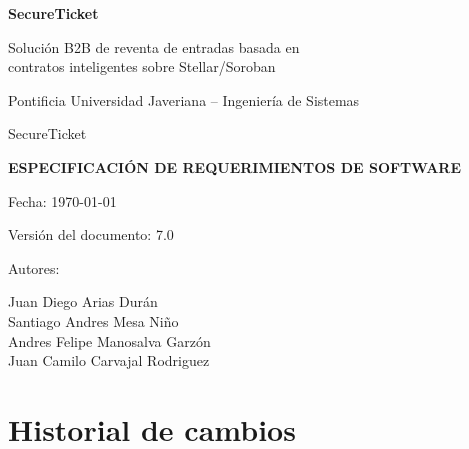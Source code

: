 \documentclass[12pt,letterpaper]{article}
\newcommand{\nombreProyecto}{SecureTicket}
\newcommand{\nombreEmpresa}{SecureTicket}
\newcommand{\universidad}{Pontificia Universidad Javeriana -- Ingeniería de Sistemas}
\newcommand{\versionDoc}{7.0}
\begin{document}
\begin{titlepage}
    \centering
    \vspace*{1cm}
    
    {\Huge \textbf{\nombreProyecto}\par}
    \vspace{0.3cm}
    {\Large Solución B2B de reventa de entradas basada en\\contratos inteligentes sobre Stellar/Soroban\par}
    \vspace{0.6cm}
    {\large \universidad\par}
    \vspace{0.5cm}
    {\large \nombreEmpresa\par}
    
    \vspace{2cm}
    {\LARGE \textbf{ESPECIFICACIÓN DE REQUERIMIENTOS DE SOFTWARE}\par}
    
    \vspace{1.5cm}
    {\large Fecha: \today\par}
    {\large Versión del documento: \versionDoc\par}
    
    \vspace{2cm}
    
    \vfill
    {\large Autores:\par}
    {\large Juan Diego Arias Durán\\
    Santiago Andres Mesa Niño\\
    Andres Felipe Manosalva Garzón\\
    Juan Camilo Carvajal Rodriguez\par}
    
    \vspace{1cm}
\end{titlepage}

\section*{Historial de cambios}
\end{document}
